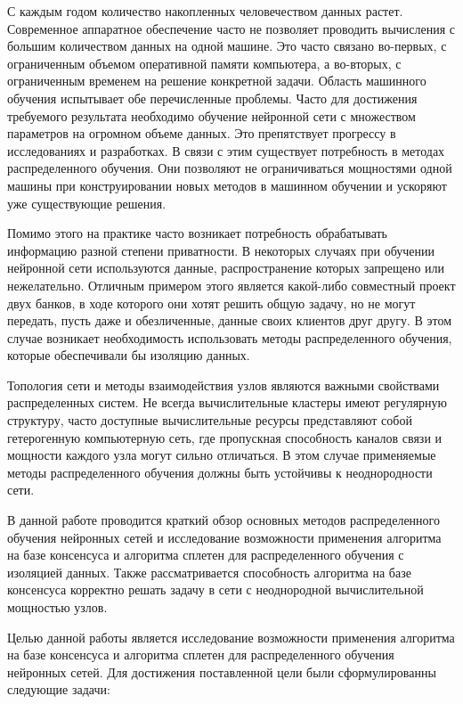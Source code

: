 \documentclass[a4paper,article,14pt]{extarticle}
\begin{document}


\tableofcontents
\pagebreak

С каждым годом количество накопленных человечеством данных растет. Современное аппаратное обеспечение часто не позволяет проводить вычисления
с большим количеством данных на одной машине. Это часто связано во-первых, с ограниченным объемом оперативной памяти компьютера,
а во-вторых, с ограниченным временем на решение конкретной задачи. Область машинного обучения испытывает обе перечисленные проблемы.
Часто для достижения требуемого результата необходимо обучение нейронной сети с множеством параметров на огромном объеме данных.
Это препятствует прогрессу в исследованиях и разработках.  В связи с этим существует потребность в методах распределенного обучения.
Они позволяют не ограничиваться мощностями одной машины при конструировании новых методов в машинном обучении
и ускоряют уже существующие решения.

Помимо этого на практике часто возникает потребность обрабатывать информацию разной степени приватности. В некоторых случаях
при обучении нейронной сети используются данные, распространение которых запрещено или нежелательно. Отличным примером этого
является какой-либо совместный проект двух банков, в ходе которого они хотят решить общую задачу, но не могут передать, пусть даже
и обезличенные, данные своих клиентов друг другу. В этом случае возникает необходимость использовать методы распределенного обучения, которые
обеспечивали бы изоляцию данных.

Топология сети и методы взаимодействия узлов являются важными свойствами распределенных систем. Не всегда вычислительные
кластеры имеют регулярную структуру, часто доступные вычислительные ресурсы представляют собой гетерогенную компьютерную сеть,
где пропускная способность каналов связи и мощности каждого узла могут сильно отличаться. В этом случае применяемые методы распределенного
обучения должны быть устойчивы к неоднородности сети.

В данной работе проводится краткий обзор основных методов распределенного обучения нейронных сетей и исследование возможности применения алгоритма на базе консенсуса и алгоритма сплетен для распределенного обучения с изоляцией данных. Также рассматривается
способность алгоритма на базе консенсуса корректно решать задачу в сети с неоднородной вычислительной мощностью узлов.
\pagebreak

Целью данной работы является исследование возможности применения алгоритма на базе консенсуса и алгоритма сплетен для распределенного
обучения нейронных сетей. Для достижения поставленной цели были сформулированны следующие задачи:
\end{document}
